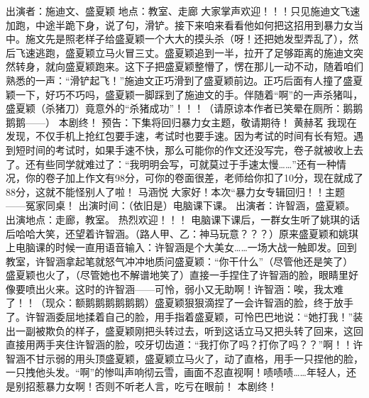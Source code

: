 {}出演者：施迪文、盛夏颖 \markdownRendererInterblockSeparator
{}地点：教室、走廊 \markdownRendererInterblockSeparator
{}大家掌声欢迎！！！只见施迪文飞速加跑，中途半跪下身，说了句，滑铲\markdownRendererTilde{}\markdownRendererTilde{}\markdownRendererTilde{}。接下来咱来看看他如何把这招用到暴力女当中。施文先是照老样子给盛夏颖一个大大的摸头杀（呀！还把她发型弄乱了），然后飞速逃跑，盛夏颖立马火冒三丈。盛夏颖追到一半，拉开了足够距离的施迪文突然转身，就向盛夏颖跑来。这下子把盛夏颖整懵了，愣在那儿一动不动，随着咱们熟悉的一声：“滑铲\markdownRendererTilde{}起飞！”施迪文正巧滑到了盛夏颖前边。正巧后面有人撞了盛夏颖一下，好巧不巧吗，盛夏颖一脚踩到了施迪文的手。伴随着“啊”的一声杀猪叫，盛夏颖（杀猪刀）竟意外的“杀猪成功”！！！（请原谅本作者已笑晕在厕所：鹅鹅鹅鹅——） \markdownRendererInterblockSeparator
{}本剧终！ \markdownRendererInterblockSeparator
{}预告：下集将回归暴力女主题，敬请期待！\markdownRendererInterblockSeparator
{}\markdownRendererInterblockSeparator
{}黄赫茗\markdownRendererInterblockSeparator
{}我现在发现，不仅手机上抢红包要手速，考试时也要手速。因为考试的时间有长有短。遇到短时间的考试时，如果手速不快，那么可能你的作文还没写完，卷子就被收上去了。还有些同学就难过了：“我明明会写，可就莫过于手速太慢……”还有一种情况，你的卷子加上作文有98分，可你的卷面很差，老师给你扣了10分，现在就成了88分，这就不能怪别人了啦！\markdownRendererInterblockSeparator
{}\markdownRendererInterblockSeparator
{}马涵悦\markdownRendererInterblockSeparator
{}大家好！本次“暴力女专辑回归！！主题——冤家同桌！\markdownRendererInterblockSeparator
{}出演时间：（依旧是）电脑课下课。 \markdownRendererInterblockSeparator
{}出演者：许智涵，盛夏颖。\markdownRendererInterblockSeparator
{}出演地点：走廊，教室。 热烈欢迎！！！\markdownRendererInterblockSeparator
{}电脑课下课后，一群女生听了姚琪的话后哈哈大笑，还望着许智涵。（路人甲、乙：神马玩意？？？）原来盛夏颖和姚琪上电脑课的时候一直用语音输入：许智涵是个大美女……一场大战一触即发。回到教室，许智涵拿起笔就怒气冲冲地质问盛夏颖：“你干什么”（尽管他还是笑了） 盛夏颖也火了，（尽管她也不解谱地笑了）直接一手捏住了许智涵的脸，眼睛里好像要喷出火来。这时的许智涵——可怜，弱小又无助啊！许智涵：唉，我太难了！！（现众：额鹅鹅鹅鹅鹅鹅\markdownRendererTilde{}\markdownRendererTilde{}）盛夏颖狠狠滴捏了一会许智涵的脸，终于放手了。许智涵委屈地揉着自己的脸，用手指着盛夏颖，可怜巴巴地说：“她打我！”装出一副被欺负的样子，盛夏颖刚把头转过去，听到这话立马又把头转了回来，这回直接用两手夹住许智涵的脸，咬牙切齿道：“我打你了吗？打你了吗？？”啊！！许智涵不甘示弱的用头顶盛夏颖，盛夏颖立马火了，动了直格，用手一只捏他的脸，一只拽他头发。“啊\markdownRendererTilde{}\markdownRendererTilde{}\markdownRendererTilde{}”的惨叫声响彻云雪，画面不忍直视啊！啧啧啧……年轻人，还是别招惹暴力女啊！否则不听老人言，吃亏在眼前！ 本剧终！\markdownRendererInterblockSeparator
